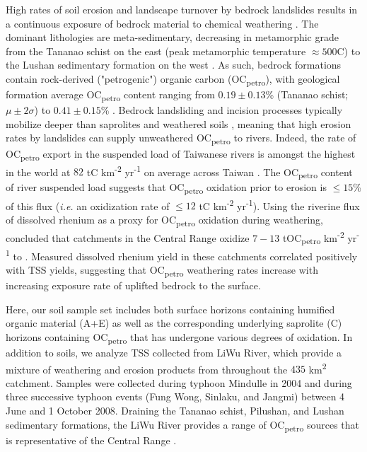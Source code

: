 High rates of soil erosion and landscape turnover by bedrock landslides \citep{Hovius:2000ht,Lin:2008fy,Hilton:2012dt} results in a continuous exposure of bedrock material to chemical weathering \citep{Hilton:2012dt,Emberson:2016fp}. The dominant lithologies are meta-sedimentary, decreasing in metamorphic grade from the Tananao schist on the east (peak metamorphic temperature $\approx 500$\textdegree C) to the Lushan sedimentary formation on the west \citep[$\leq 150$\textdegree C; Figure \ref{Ch6Fig:S1};][]{Beyssac:2007wg}. As such, bedrock formations contain rock-derived ("petrogenic") organic carbon (OC\textsubscript{petro}), with geological formation average OC\textsubscript{petro} content ranging from $0.19 \pm 0.13$\% (Tananao schist; $\mu \pm 2\sigma$) to $0.41 \pm 0.15$\% \citep[Lushan formation;][]{Hilton:2010cg}. Bedrock landsliding and incision processes typically mobilize deeper than saprolites and weathered soils \citep{Larsen:2010dr}, meaning that high erosion rates by landslides can supply unweathered OC\textsubscript{petro} to rivers. Indeed, the rate of OC\textsubscript{petro} export in the suspended load of Taiwanese rivers is amongst the highest in the world at $82$ tC km\textsuperscript{-2} yr\textsuperscript{-1} on average across Taiwan \citep{Hilton:2011jw}. The OC\textsubscript{petro} content of river suspended load suggests that OC\textsubscript{petro} oxidation prior to erosion is $\leq 15$\% of this flux (\textit{i.e.} an oxidization rate of $\leq 12$ tC km\textsuperscript{-2} yr\textsuperscript{-1}). Using the riverine flux of dissolved rhenium as a proxy for OC\textsubscript{petro} oxidation during weathering, \citet{Hilton:2014dh} concluded that catchments in the Central Range oxidize $7 - 13$ tOC\textsubscript{petro} km\textsuperscript{-2} yr\textsuperscript{-1} to . Measured dissolved rhenium yield in these catchments correlated positively with TSS yields, suggesting that OC\textsubscript{petro} weathering rates increase with increasing exposure rate of uplifted bedrock to the surface.

Here, our soil sample set includes both surface horizons containing humified organic material (A+E) as well as the corresponding underlying saprolite (C) horizons containing OC\textsubscript{petro} that has undergone various degrees of oxidation. In addition to soils, we analyze TSS collected from LiWu River, which provide a mixture of weathering and erosion products from throughout the $435$ km\textsuperscript{2} catchment. Samples were collected during typhoon Mindulle in 2004 and during three successive typhoon events (Fung Wong, Sinlaku, and Jangmi) between 4 June and 1 October 2008. Draining the Tananao schist, Pilushan, and Lushan sedimentary formations, the LiWu River provides a range of OC\textsubscript{petro} sources that is representative of the Central Range \citep{Hilton:2010cg}.

